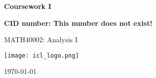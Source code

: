 \documentclass[10pt, a4paper]{article}
\begin{document}
\begin{titlepage}
    \begin{center}
        \vspace*{3cm}
            
        \Huge
        \textbf{
        Coursework I}
            
            
        \vspace{1.5cm}
        \Large
            
        \textbf{
        CID number: This number does not exist!}%
        
            
        \vfill
        
MATH40002: Analysis I
        \vspace{1cm}
            
        \texttt{[image: icl\_logo.png]}
        \\
        
        \Large
        
        \today
            
    \end{center}
\end{titlepage}
\end{document}
